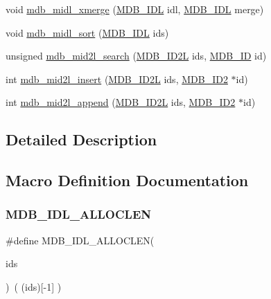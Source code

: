 \begin{DoxyCompactItemize}
void \mbox{\hyperlink{group__idls_ga35e6813874447861b772f4089ce9fa70}{mdb\+\_\+midl\+\_\+xmerge}} (\mbox{\hyperlink{group__idls_ga238cc39c422225e05cb3897e641ca9e5}{M\+D\+B\+\_\+\+I\+DL}} idl, \mbox{\hyperlink{group__idls_ga238cc39c422225e05cb3897e641ca9e5}{M\+D\+B\+\_\+\+I\+DL}} merge)
\item 
void \mbox{\hyperlink{group__idls_gac3fe60f3087a5fdba4908f53a62d16d5}{mdb\+\_\+midl\+\_\+sort}} (\mbox{\hyperlink{group__idls_ga238cc39c422225e05cb3897e641ca9e5}{M\+D\+B\+\_\+\+I\+DL}} ids)
\item 
unsigned \mbox{\hyperlink{group__idls_ga4fbf5726f08ac891bbea111b712ab424}{mdb\+\_\+mid2l\+\_\+search}} (\mbox{\hyperlink{group__idls_gafcc5d61c06c726db2be5d088dbc68d51}{M\+D\+B\+\_\+\+I\+D2L}} ids, \mbox{\hyperlink{group__idls_ga792192229a977c49f083846b5635f92d}{M\+D\+B\+\_\+\+ID}} id)
\item 
int \mbox{\hyperlink{group__idls_ga7cf657facd99bec0e29ea05bda96e4a5}{mdb\+\_\+mid2l\+\_\+insert}} (\mbox{\hyperlink{group__idls_gafcc5d61c06c726db2be5d088dbc68d51}{M\+D\+B\+\_\+\+I\+D2L}} ids, \mbox{\hyperlink{struct_m_d_b___i_d2}{M\+D\+B\+\_\+\+I\+D2}} $\ast$id)
\item 
int \mbox{\hyperlink{group__idls_ga54b5ab87ee3746dc4926d25d3887dfab}{mdb\+\_\+mid2l\+\_\+append}} (\mbox{\hyperlink{group__idls_gafcc5d61c06c726db2be5d088dbc68d51}{M\+D\+B\+\_\+\+I\+D2L}} ids, \mbox{\hyperlink{struct_m_d_b___i_d2}{M\+D\+B\+\_\+\+I\+D2}} $\ast$id)
\end{DoxyCompactItemize}


\subsection{Detailed Description}


\subsection{Macro Definition Documentation}
\mbox{\label{group__idls_ga4dad2db495180fe6ba5a39fdbf493703}} 
\subsubsection{\texorpdfstring{M\+D\+B\+\_\+\+I\+D\+L\+\_\+\+A\+L\+L\+O\+C\+L\+EN}{MDB\_IDL\_ALLOCLEN}}
{\footnotesize\ttfamily \#define M\+D\+B\+\_\+\+I\+D\+L\+\_\+\+A\+L\+L\+O\+C\+L\+EN(\begin{DoxyParamCaption}\item[{}]{ids }\end{DoxyParamCaption})~( (ids)\mbox{[}-\/1\mbox{]} )}

